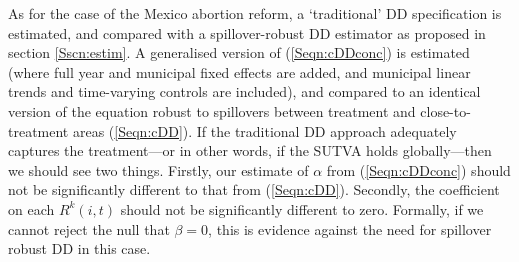 


As for the case of the Mexico abortion reform, a `traditional' DD specification
is estimated, and compared with a spillover-robust DD estimator as proposed in
section \ref{Sscn:estim}.  A generalised version of (\ref{Seqn:cDDconc}) is 
estimated (where full year and municipal fixed effects are added, and municipal 
linear trends and time-varying controls are included), and compared to an 
identical version of the equation robust to spillovers between treatment and 
close-to-treatment areas (\ref{Seqn:cDD}).  If the traditional DD approach 
adequately captures the treatment---or in other words, if the SUTVA holds 
globally---then we should see two things. Firstly, our estimate of $\alpha$ 
from (\ref{Seqn:cDDconc}) should not be significantly different to that from 
(\ref{Seqn:cDD}). Secondly, the coefficient on each $R^k(i,t)$ should not be 
significantly different to zero.  Formally, if we cannot reject the null that 
$\beta=0$, this is evidence against the need for spillover robust DD in this 
case.



